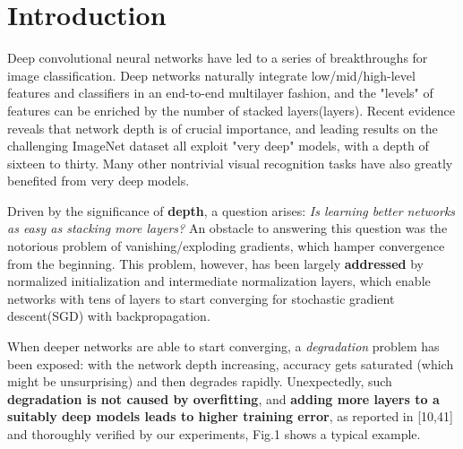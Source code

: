 \section{Introduction}
\label{sec:intro}

Deep convolutional neural networks have led to a series of breakthroughs for image classification. Deep networks naturally integrate low/mid/high-level features and classifiers in an end-to-end multilayer fashion, and the "levels" of features can be enriched by the number of stacked layers(layers). Recent evidence reveals that network depth is of crucial importance, and leading results on the challenging ImageNet dataset all exploit "very deep" models, with a depth of sixteen to thirty. Many other nontrivial visual recognition tasks have also greatly benefited from very deep models.

Driven by the significance of \textbf{depth}, a question arises: \textit{Is learning better networks as easy as stacking more layers?} An obstacle to answering this question was the notorious problem of vanishing/exploding gradients, which hamper convergence from the beginning. This problem, however, has been largely \textbf{addressed} by normalized initialization and intermediate normalization layers, which enable networks with tens of layers to start converging for stochastic gradient descent(SGD) with backpropagation.

When deeper networks are able to start converging, a \textit{degradation} problem has been exposed: with the network depth increasing, accuracy gets saturated (which might be unsurprising) and then degrades rapidly. Unexpectedly, such \textbf{degradation is not caused by overfitting}, and \textbf{adding more layers to a suitably deep models leads to higher training error}, as reported in [10,41] and thoroughly verified by our experiments, Fig.1 shows a typical example. 

